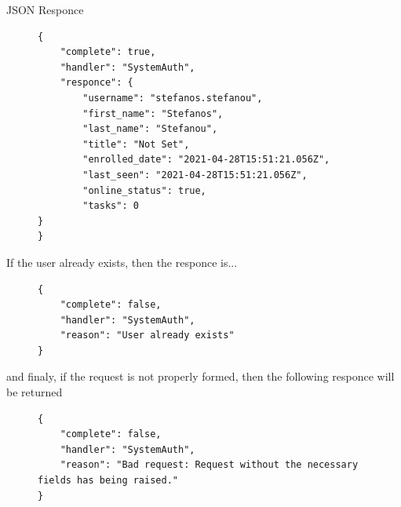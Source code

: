 					JSON Responce
					\begin{figure}[H]
						\iftrue
						\begin{lstlisting}[]
{
	"complete": true,
	"handler": "SystemAuth",
	"responce": {
		"username": "stefanos.stefanou",
		"first_name": "Stefanos",
		"last_name": "Stefanou",
		"title": "Not Set",
		"enrolled_date": "2021-04-28T15:51:21.056Z",
		"last_seen": "2021-04-28T15:51:21.056Z",
		"online_status": true,
		"tasks": 0
}
}
						\end{lstlisting}
					\end{figure}
					If the user already exists, then the responce is...
					\begin{figure}[H]
						\iftrue
						\begin{lstlisting}[]
{
	"complete": false,
	"handler": "SystemAuth",
	"reason": "User already exists"
}
						\end{lstlisting}
					\end{figure}
					and finaly, if the request is not properly formed, then the following responce will be returned
					\begin{figure}[H]
						\iftrue
						\begin{lstlisting}[]
{
	"complete": false,
	"handler": "SystemAuth",
	"reason": "Bad request: Request without the necessary fields has being raised."
}
						\end{lstlisting}
					\end{figure}
